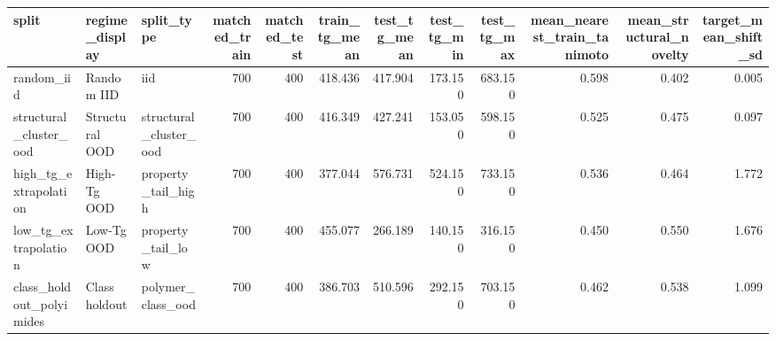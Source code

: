 \begin{tabular}{lllrrrrrrrrr}
\toprule
split & regime\_display & split\_type & matched\_train & matched\_test & train\_tg\_mean & test\_tg\_mean & test\_tg\_min & test\_tg\_max & mean\_nearest\_train\_tanimoto & mean\_structural\_novelty & target\_mean\_shift\_sd \\
\midrule
random\_iid & Random IID & iid & 700 & 400 & 418.436 & 417.904 & 173.150 & 683.150 & 0.598 & 0.402 & 0.005 \\
structural\_cluster\_ood & Structural OOD & structural\_cluster\_ood & 700 & 400 & 416.349 & 427.241 & 153.050 & 598.150 & 0.525 & 0.475 & 0.097 \\
high\_tg\_extrapolation & High-Tg OOD & property\_tail\_high & 700 & 400 & 377.044 & 576.731 & 524.150 & 733.150 & 0.536 & 0.464 & 1.772 \\
low\_tg\_extrapolation & Low-Tg OOD & property\_tail\_low & 700 & 400 & 455.077 & 266.189 & 140.150 & 316.150 & 0.450 & 0.550 & 1.676 \\
class\_holdout\_polyimides & Class holdout & polymer\_class\_ood & 700 & 400 & 386.703 & 510.596 & 292.150 & 703.150 & 0.462 & 0.538 & 1.099 \\
\bottomrule
\end{tabular}
